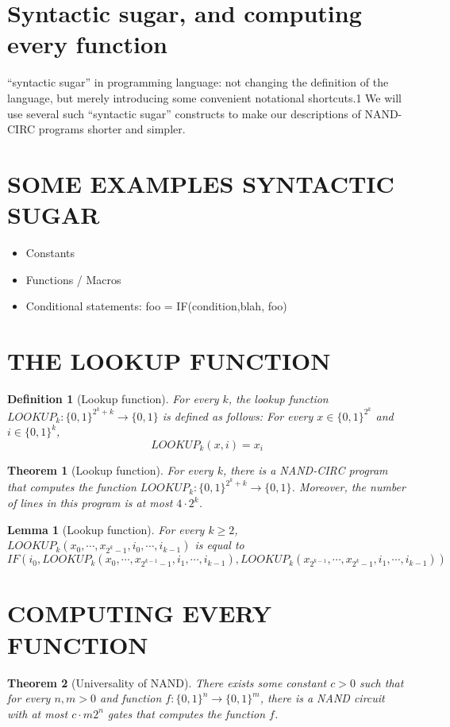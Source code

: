 \documentclass[aps,pra,onecolumn,notitlepage,superscriptaddress]{revtex4-1}
\newtheorem{theo}{Theorem}
\newtheorem{lemma}{Lemma}
\newtheorem{defi}{Definition}
\begin{document}
    \section{Syntactic sugar, and computing every function}
    ``syntactic sugar'' in programming language: not changing the definition of the language, but merely introducing some convenient notational shortcuts.1 We will use several such ``syntactic sugar'' constructs to make our descriptions of NAND-CIRC programs shorter and simpler.

    \section{SOME EXAMPLES SYNTACTIC SUGAR}
    \begin{itemize}
        \item Constants
        \item Functions / Macros
        \item Conditional statements: foo = IF(condition,blah, foo)
    \end{itemize}
    
    \section{THE LOOKUP FUNCTION}
    \begin{defi} [Lookup function]
        For every $k$, the lookup function $LOOKUP_k: \{0, 1\}^{2^k + k} \rightarrow \{0, 1\}$ is defined as follows: For every $x \in \{0, 1\}^{2^k}$ and $i \in \{0, 1\}^𝑘$,
        \begin{equation}
            LOOKUP_k(x,i) = x_i
        \end{equation}
    \end{defi}

    \begin{theo} [Lookup function]
        For every $k$, there is a NAND-CIRC program that computes the function $LOOKUP_k: \{0, 1\}^{2^k+k} \rightarrow \{0, 1\}$. Moreover, the number of lines in this program is at most $4 \cdot 2^k$.
    \end{theo}

    \begin{lemma} [Lookup function]
        For every $k \geq 2$, $LOOKUP_k(x_0, \cdots, x_{2^k-1}, i_0, \cdots, i_{k-1})$ is equal to
        \begin{equation}
            IF(i_0, LOOKUP_k(x_0, \cdots, x_{2^{k-1}-1}, i_1, \cdots, i_{k-1}), LOOKUP_k(x_{2^{k-1}}, \cdots, x_{2^k-1}, i_1, \cdots, i_{k-1}))
        \end{equation}
    \end{lemma}

    \section{COMPUTING EVERY FUNCTION}
    \begin{theo} [Universality of NAND]
        There exists some constant $c > 0$ such that for every $n, m > 0$ and function $f : \{0, 1\}^n \to \{0, 1\}^m$, there is a NAND circuit with at most $c \cdot m 2^n$ gates that computes the function $f$.
    \end{theo}

    
\end{document}
